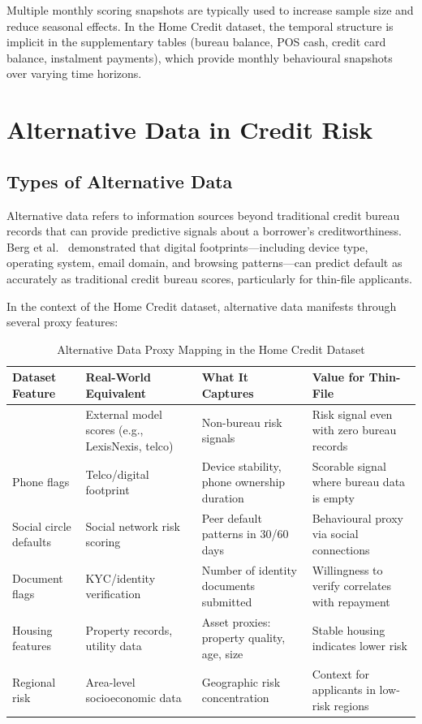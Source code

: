 Multiple monthly scoring snapshots are typically used to increase sample size and reduce seasonal effects. In the Home Credit dataset, the temporal structure is implicit in the supplementary tables (bureau balance, POS cash, credit card balance, instalment payments), which provide monthly behavioural snapshots over varying time horizons.

\section{Alternative Data in Credit Risk}
\label{sec:alternative_data}

\subsection{Types of Alternative Data}

Alternative data refers to information sources beyond traditional credit bureau records that can provide predictive signals about a borrower's creditworthiness. Berg et al.~\cite{berg2020} demonstrated that digital footprints---including device type, operating system, email domain, and browsing patterns---can predict default as accurately as traditional credit bureau scores, particularly for thin-file applicants.

In the context of the Home Credit dataset, alternative data manifests through several proxy features:

\begin{table}[H]
\centering
\caption{Alternative Data Proxy Mapping in the Home Credit Dataset}
\label{tab:alt_data_mapping}
\small
\setlength{\tabcolsep}{4pt}
\renewcommand{\arraystretch}{1.08}
\begin{tabular}{L{2.7cm}L{3.2cm}L{4.0cm}L{5.2cm}}
\toprule
\textbf{Dataset Feature} & \textbf{Real-World Equivalent} & \textbf{What It Captures} & \textbf{Value for Thin-File} \\
\midrule
{} & External model scores (e.g., LexisNexis, telco) & Non-bureau risk signals & Risk signal even with zero bureau records \\
Phone flags & Telco/digital footprint & Device stability, phone ownership duration & Scorable signal where bureau data is empty \\
Social circle defaults & Social network risk scoring & Peer default patterns in 30/60 days & Behavioural proxy via social connections \\
Document flags & KYC/identity verification & Number of identity documents submitted & Willingness to verify correlates with repayment \\
Housing features & Property records, utility data & Asset proxies: property quality, age, size & Stable housing indicates lower risk \\
Regional risk & Area-level socioeconomic data & Geographic risk concentration & Context for applicants in low-risk regions \\
\bottomrule
\end{tabular}
\end{table}

